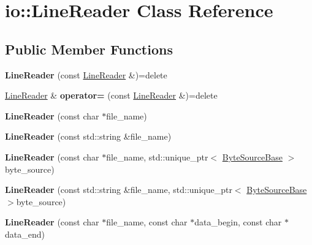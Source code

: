 \hypertarget{classio_1_1LineReader}{}\section{io\+:\+:Line\+Reader Class Reference}
\label{classio_1_1LineReader}
\subsection*{Public Member Functions}
\begin{DoxyCompactItemize}
\item 
\mbox{\label{classio_1_1LineReader_a84f2957de769bb701eaaddfd8bc004dd}} 
{\bfseries Line\+Reader} (const \hyperlink{classio_1_1LineReader}{Line\+Reader} \&)=delete
\item 
\mbox{\label{classio_1_1LineReader_a9ebd7beca16060ffc0ea8df3c0c6ff25}} 
\hyperlink{classio_1_1LineReader}{Line\+Reader} \& {\bfseries operator=} (const \hyperlink{classio_1_1LineReader}{Line\+Reader} \&)=delete
\item 
\mbox{\label{classio_1_1LineReader_a81a75d3f53725d35822f490007520e29}} 
{\bfseries Line\+Reader} (const char $\ast$file\+\_\+name)
\item 
\mbox{\label{classio_1_1LineReader_ab0eb26f44fa6b18f9c39dfb2561ac882}} 
{\bfseries Line\+Reader} (const std\+::string \&file\+\_\+name)
\item 
\mbox{\label{classio_1_1LineReader_af4ebb130a7d6c78356573f6d0304266c}} 
{\bfseries Line\+Reader} (const char $\ast$file\+\_\+name, std\+::unique\+\_\+ptr$<$ \hyperlink{classio_1_1ByteSourceBase}{Byte\+Source\+Base} $>$byte\+\_\+source)
\item 
\mbox{\label{classio_1_1LineReader_ab625b3a8001dca811b0e211c6cfc1b28}} 
{\bfseries Line\+Reader} (const std\+::string \&file\+\_\+name, std\+::unique\+\_\+ptr$<$ \hyperlink{classio_1_1ByteSourceBase}{Byte\+Source\+Base} $>$byte\+\_\+source)
\item 
\mbox{\label{classio_1_1LineReader_ad5a65d6f23474884061a77ea858c042b}} 
{\bfseries Line\+Reader} (const char $\ast$file\+\_\+name, const char $\ast$data\+\_\+begin, const char $\ast$data\+\_\+end)

\end{DoxyCompactItemize}
